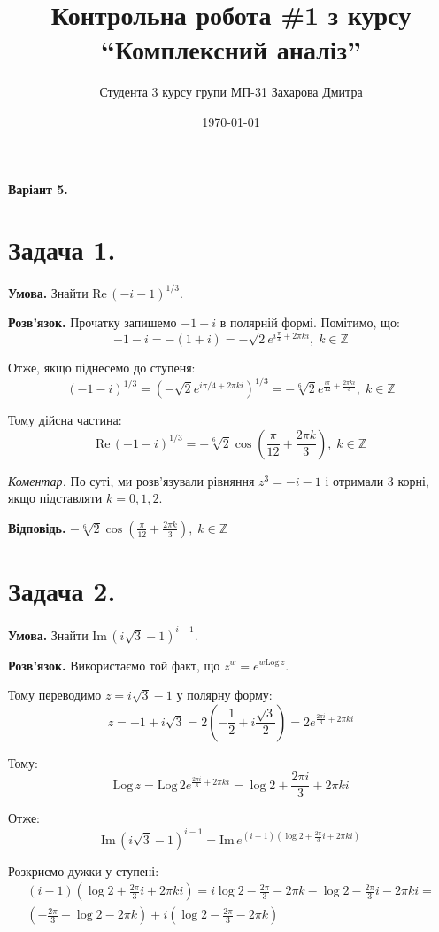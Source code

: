 \documentclass[14pt]{extarticle}
\title{Контрольна робота \#1 з курсу ``Комплексний аналіз''}
\author{Студента 3 курсу групи МП-31 Захарова Дмитра}
\date{\today}
\begin{document}
\maketitle

\textbf{Варіант 5.}
\section*{Задача 1.} 

\textbf{Умова.} Знайти $\text{Re}\,(-i-1)^{1/3}$.

\textbf{Розв'язок.} Прочатку запишемо $-1-i$ в полярній формі. Помітимо, що:
\[
-1-i = -(1+i)=-\sqrt{2}e^{i\frac{\pi}{4} + 2\pi k i},\; k \in \mathbb{Z}
\]

Отже, якщо піднесемо до ступеня:
\[
(-1-i)^{1/3} = (-\sqrt{2}e^{i\pi / 4 + 2\pi k i})^{1/3} = -\sqrt[6]{2}e^{\frac{i\pi}{12} + \frac{2\pi k i}{3}},\; k\in\mathbb{Z}
\]

Тому дійсна частина:
\[
\text{Re} \, (-1-i)^{1/3} = -\sqrt[6]{2}\cos\left(\frac{\pi}{12}+\frac{2\pi k}{3}\right), \; k \in\mathbb{Z}
\]

\textit{Коментар.} По суті, ми розв'язували рівняння $z^3=-i-1$ і отримали 3 корні, якщо підставляти $k=0,1,2$.

\textbf{Відповідь.} $-\sqrt[6]{2}\cos\left(\frac{\pi}{12}+\frac{2\pi k}{3}\right), \; k \in\mathbb{Z}$

\pagebreak
\section*{Задача 2.} 

\textbf{Умова.} Знайти $\text{Im}\, (i\sqrt{3}-1)^{i-1}$.

\textbf{Розв'язок.} Використаємо той факт, що $z^w = e^{w \text{Log}\, z}$.

Тому переводимо $z=i\sqrt{3}-1$ у полярну форму:
\[
z = -1+i\sqrt{3} = 2\left(-\frac{1}{2}+i \frac{\sqrt{3}}{2}\right) = 2e^{\frac{2\pi i}{3}+2\pi k i}
\]

Тому:
\[
\text{Log}\, z = \text{Log}\, 2e^{\frac{2\pi i}{3} + 2\pi k i} = \log 2 + \frac{2\pi i}{3} + 2\pi k i
\]

Отже:
\[
\text{Im}\, (i\sqrt{3}-1)^{i-1} = \text{Im}\, e^{(i-1)(\log 2 + \frac{2\pi}{3} i + 2\pi k i)}
\]

Розкриємо дужки у ступені:
\begin{align*}
(i-1)\left(\log 2 + \frac{2\pi}{3} i + 2\pi k i\right) = i \log 2 - \frac{2\pi}{3} - 2\pi k - \log 2 - \frac{2\pi}{3} i - 2 \pi k i = \\
\left(-\frac{2\pi}{3} -\log 2 - 2\pi k\right) + i\left(\log 2 - \frac{2\pi}{3} - 2\pi k\right)
\end{align*}
\end{document}
